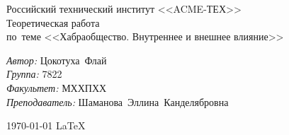 
\begin{titlepage} %

\begin{center} %

\large Российский технический институт <<ACME-ТЕХ>>\\[4.5cm]

\huge Теоретическая работа \\[0.6cm] %
\large по~теме <<Хабраобщество. Внутреннее и внешнее влияние>>\\[3.7cm]

\begin{minipage}{0.5\textwidth} %
\begin{flushleft} %
\emph{Автор:} Цокотуха~Флай\\
\emph{Группа:} 7822\\
\emph{Факультет:} МХХПХХ\\
\emph{Преподаватель:} Шаманова~Эллина~Канделябровна
\end{flushleft} %
\end{minipage} %

\vfill %

{\large \today} %
{\large \LaTeX} %

\end{center} %

\thispagestyle{empty} %
\end{titlepage} %
